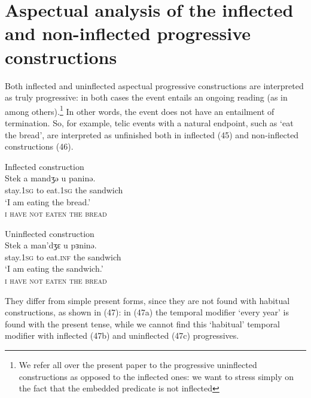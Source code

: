 \documentclass[output=paper]{langsci/langscibook}
\begin{document}
\section{Aspectual analysis of the inflected and non-inflected progressive constructions}%
Both inflected and uninflected aspectual progressive constructions are interpreted as truly progressive: in both cases the event entails an ongoing reading (as in \citealt{Arosio2011} among others).\footnote{We refer all over the present paper to the progressive uninflected constructions as opposed to the inflected ones: we want to stress simply on the fact that the embedded predicate is not inflected} In other words, the event does not have an entailment of termination. So, for example, telic events with a natural endpoint, such as ‘eat the bread’, are interpreted as unfinished both in inflected (45) and non-inflected constructions (46). 

\ea%
         Inflected construction\label{ex:lorusso:45}\\
    \gll Stek     a  mandʒə   u  paninə. \\
         stay.\textsc{1sg} to  eat.\textsc{1sg} the   sandwich \\
    \glt ‘I am eating the bread.’\\\textsc{i have not eaten the bread}
\z



\ea%
         Uninflected construction\label{ex:lorusso:46}\\
    \gll Stek     a  man’dʒɛ  u  pɜninə.     \\
         stay.\textsc{1sg} to  eat.\textsc{inf} the   sandwich \\
    \glt ‘I am eating the sandwich.’\\\textsc{i have not eaten the bread}
\z 

They differ from simple present forms, since they are not found with habitual constructions, as shown in (47): in (47a) the temporal modifier ‘every year’ is found with the present tense, while we cannot find this ‘habitual’ temporal modifier with inflected (47b) and uninflected (47c) progressives.

\ea%
    \label{ex:lorusso:47}
    \z
\z
\end{document}
